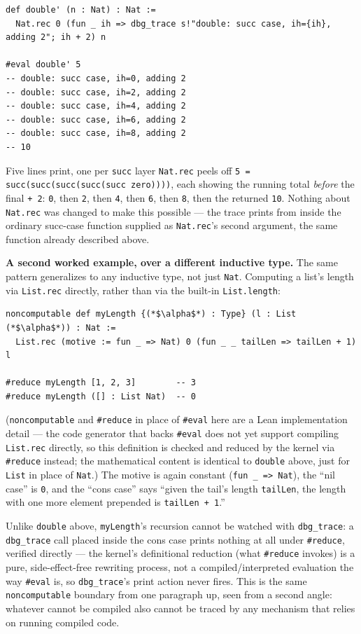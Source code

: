 \begin{lstlisting}
def double' (n : Nat) : Nat :=
  Nat.rec 0 (fun _ ih => dbg_trace s!"double: succ case, ih={ih}, adding 2"; ih + 2) n

#eval double' 5
-- double: succ case, ih=0, adding 2
-- double: succ case, ih=2, adding 2
-- double: succ case, ih=4, adding 2
-- double: succ case, ih=6, adding 2
-- double: succ case, ih=8, adding 2
-- 10
\end{lstlisting}

Five lines print, one per \texttt{succ} layer \texttt{Nat.rec} peels off \texttt{5 = succ(succ(succ(succ(succ zero))))}, each showing the running total \emph{before} the final \texttt{+ 2}: \texttt{0}, then \texttt{2}, then \texttt{4}, then \texttt{6}, then \texttt{8}, then the returned \texttt{10}. Nothing about \texttt{Nat.rec} was changed to make this possible --- the trace prints from inside the ordinary succ-case function supplied as \texttt{Nat.rec}'s second argument, the same function already described above.

\textbf{A second worked example, over a different inductive type.} The same pattern generalizes to any inductive type, not just \texttt{Nat}. Computing a list's length via \texttt{List.rec} directly, rather than via the built-in \texttt{List.length}:

\begin{lstlisting}
noncomputable def myLength {(*$\alpha$*) : Type} (l : List (*$\alpha$*)) : Nat :=
  List.rec (motive := fun _ => Nat) 0 (fun _ _ tailLen => tailLen + 1) l

#reduce myLength [1, 2, 3]        -- 3
#reduce myLength ([] : List Nat)  -- 0
\end{lstlisting}

(\texttt{noncomputable} and \texttt{\#reduce} in place of \texttt{\#eval} here are a Lean implementation detail --- the code generator that backs \texttt{\#eval} does not yet support compiling \texttt{List.rec} directly, so this definition is checked and reduced by the kernel via \texttt{\#reduce} instead; the mathematical content is identical to \texttt{double} above, just for \texttt{List} in place of \texttt{Nat}.) The motive is again constant (\texttt{fun \_\allowbreak{} => Nat}), the ``nil case'' is \texttt{0}, and the ``cons case'' says ``given the tail's length \texttt{tailLen}, the length with one more element prepended is \texttt{tailLen + 1}.''

Unlike \texttt{double} above, \texttt{myLength}'s recursion cannot be watched with \texttt{dbg\_\allowbreak{}trace}: a \texttt{dbg\_\allowbreak{}trace} call placed inside the cons case prints nothing at all under \texttt{\#reduce}, verified directly --- the kernel's definitional reduction (what \texttt{\#reduce} invokes) is a pure, side-effect-free rewriting process, not a compiled/interpreted evaluation the way \texttt{\#eval} is, so \texttt{dbg\_\allowbreak{}trace}'s print action never fires. This is the same \texttt{noncomputable} boundary from one paragraph up, seen from a second angle: whatever cannot be compiled also cannot be traced by any mechanism that relies on running compiled code.

